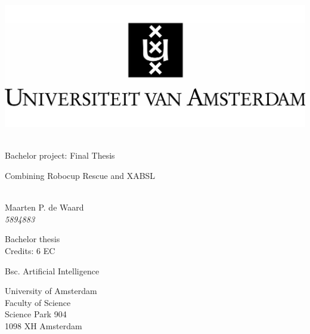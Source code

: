 \onecolumn
\begin{center}
\thispagestyle{empty}


\vspace{2.5cm}

\includegraphics[width=.7\textwidth]{uva.jpg}\\
\vspace{0.5cm}
\hrulefill\\
\begin{Huge}
Bachelor project: Final Thesis\\
\end{Huge}
\vspace{0.2cm}
\begin{Large} 
Combining Robocup Rescue and XABSL\\
\end{Large}
\hrulefill\\

{
\Large
Maarten P. de Waard\\\vspace{0.2cm}
\textit{5894883}
}

\vspace{1.5cm}

Bachelor thesis\\
Credits: 6 EC

\vspace{0.5cm}

Bsc. Artificial Intelligence

\vspace{0.25cm}

University of Amsterdam\\
Faculty of Science\\
Science Park 904\\
1098 XH Amsterdam


\end{center}
